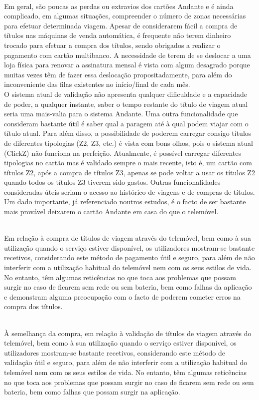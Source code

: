 ~\\Em geral, são poucas as perdas ou extravios dos cartões Andante e é ainda complicado, em algumas situações, compreender o número de zonas necessárias para efetuar determinada viagem. Apesar de considerarem fácil a compra de títulos nas máquinas de venda automática, é frequente não terem dinheiro trocado para efetuar a compra dos títulos, sendo obrigados a realizar o pagamento com cartão multibanco. A necessidade de terem de se deslocar a uma loja física para renovar a assinatura mensal é vista com algum desagrado porque muitas vezes têm de fazer essa deslocação propositadamente, para além do inconveniente das filas existentes no início/final de cada mês.
\\O sistema atual de validação não apresenta qualquer dificuldade e a capacidade de poder, a qualquer instante, saber o tempo restante do título de viagem atual seria uma mais-valia para o sistema Andante. Uma outra funcionalidade que consideram bastante útil é saber qual a paragem até à qual podem viajar com o título atual. Para além disso, a possibilidade de poderem carregar consigo títulos de diferentes tipologias (Z2, Z3, etc.) é vista com bons olhos, pois o sistema atual (ClickZ) não funciona na perfeição. Atualmente, é possível carregar diferentes tipologias no cartão mas é validado sempre o mais recente, isto é, um cartão com títulos Z2, após a compra de títulos Z3, apenas se pode voltar a usar os títulos Z2 quando todos os títulos Z3 tiverem sido gastos. Outras funcionalidades consideradas úteis seriam o acesso ao histórico de viagens e de compras de títulos.
\\Um dado importante, já referenciado noutros estudos, é o facto de ser bastante mais provável deixarem o cartão Andante em casa do que o telemóvel.

~\\Em relação à compra de títulos de viagem através do telemóvel, bem como à sua utilização quando o serviço estiver disponível, os utilizadores mostram-se bastante recetivos, considerando este método de pagamento útil e seguro, para além de não interferir com a utilização habitual do telemóvel nem com os seus estilos de vida. No entanto, têm algumas reticências no que toca aos problemas que possam surgir no caso de ficarem sem rede ou sem bateria, bem como falhas da aplicação e demonstram alguma preocupação com o facto de poderem cometer erros na compra dos títulos.

~\\À semelhança da compra, em relação à validação de títulos de viagem através do telemóvel, bem como à sua utilização quando o serviço estiver disponível, os utilizadores mostram-se bastante recetivos, considerando este método de validação útil e seguro, para além de não interferir com a utilização habitual do telemóvel nem com os seus estilos de vida. No entanto, têm algumas reticências no que toca aos problemas que possam surgir no caso de ficarem sem rede ou sem bateria, bem como falhas que possam surgir na aplicação.

